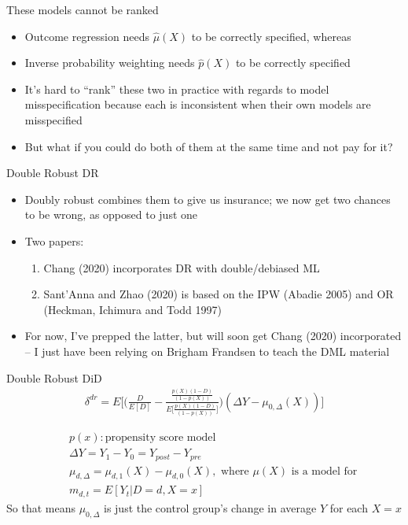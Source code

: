 \documentclass{beamer}
\begin{document}
\begin{frame}{These models cannot be ranked}

\begin{itemize}
\item Outcome regression needs $\widehat{\mu}(X)$ to be correctly specified, whereas
\item Inverse probability weighting needs $\widehat{p}(X)$ to be correctly specified
\item It's hard to ``rank'' these two in practice with regards to model misspecification because each is inconsistent when their own models are misspecified
\item But what if you could do both of them at the same time and not pay for it?
\end{itemize}

\end{frame}

\begin{frame}{Double Robust DR}

\begin{itemize}
\item Doubly robust combines them to give us insurance; we now get two chances to be wrong, as opposed to just one
\item Two papers:
	\begin{enumerate}
	\item Chang (2020) incorporates DR with double/debiased ML
	\item Sant'Anna and Zhao (2020) is based on the IPW (Abadie 2005) and OR (Heckman, Ichimura and Todd 1997)
	\end{enumerate}
\item For now, I've prepped the latter, but will soon get Chang (2020) incorporated -- I just have been relying on Brigham Frandsen to teach the DML material
\end{itemize}

\end{frame}



\begin{frame}{Double Robust DiD}
\begin{eqnarray*}
\delta^{dr} = E \bigg [ \bigg ( \frac{D}{E[D]} -\frac{ \frac{p(X)(1-D)}{(1-p(X))} }{E \bigg [\frac{p(X)(1-D)}{(1-p(X))} \bigg ]} \bigg  )( \Delta Y - \mu_{0,\Delta}(X)) \bigg ]
\end{eqnarray*}

\begin{eqnarray*}
&&p(x): \text{propensity score model} \\
&& \Delta Y = Y_1 - Y_0 = Y_{post} - Y_{pre} \\
&& \mu_{d,\Delta} = \mu_{d,1}(X) - \mu_{d,0}(X), \text{ where } \mu(X) \text{ is a model for} \\
&& m_{d,t} = E[Y_t|D=d,X=x]
\end{eqnarray*}So that means $\mu_{0,\Delta}$ is just the control group's change in average $Y$ for each $X=x$

\end{frame}
\end{document}
